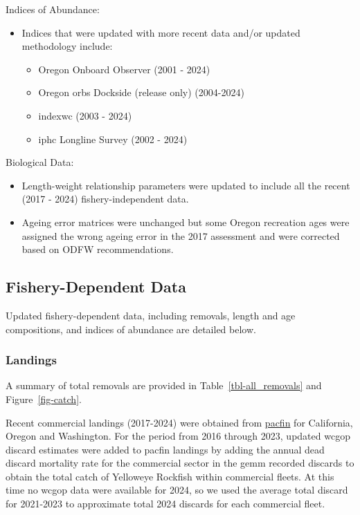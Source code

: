 \documentclass[
]{scrartcl}
\providecommand{\tightlist}{%
  \setlength{\itemsep}{0pt}\setlength{\parskip}{0pt}}\usepackage{longtable,booktabs,array}
\begin{document}
Indices of Abundance:

\begin{itemize}
\tightlist
\item
  Indices that were updated with more recent data and/or updated
  methodology include:

  \begin{itemize}
  \tightlist
  \item
    Oregon Onboard Observer (2001 - 2024)
  \item
    Oregon \gls{orbs} Dockside (release only) (2004-2024)
  \item
    \gls{indexwc} (2003 - 2024)
  \item
    \gls{iphc} Longline Survey (2002 - 2024)
  \end{itemize}
\end{itemize}

Biological Data:

\begin{itemize}
\tightlist
\item
  Length-weight relationship parameters were updated to include all the
  recent (2017 - 2024) fishery-independent data.
\item
  Ageing error matrices were unchanged but some Oregon recreation ages
  were assigned the wrong ageing error in the 2017 assessment and were
  corrected based on ODFW recommendations.
\end{itemize}

\subsection{Fishery-Dependent Data}\label{fishery-dependent-data}

Updated fishery-dependent data, including removals, length and age
compositions, and indices of abundance are detailed below.

\subsubsection{Landings}\label{landings}

A summary of total removals are provided in Table~\ref{tbl-all_removals}
and Figure~\ref{fig-catch}.

Recent commercial landings (2017-2024) were obtained from
\href{www.pacfin.psmfc.org}{\gls{pacfin}} for California, Oregon and
Washington. For the period from 2016 through 2023, updated \gls{wcgop}
discard estimates were added to \gls{pacfin} landings by adding the
annual dead discard mortality rate for the commercial sector in the
\gls{gemm} recorded discards to obtain the total catch of Yelloweye
Rockfish within commercial fleets. At this time no \gls{wcgop} data were
available for 2024, so we used the average total discard for 2021-2023
to approximate total 2024 discards for each commercial fleet.
\end{document}

